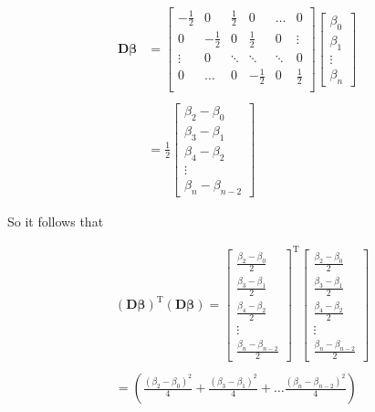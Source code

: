 \documentclass{article}
\newcommand{\B}{\boldsymbol\beta} %
\newcommand{\D}{\mathbf{D}}
\begin{document}
\begin{align*}
  \D\B &= \begin{bmatrix}
    -\frac{1}{2} & 0 & \frac{1}{2} & 0 & \dots & 0 \\
    0 & -\frac{1}{2} & 0 & \frac{1}{2} & 0 & \vdots \\
    \vdots & 0 & \ddots & \ddots & \ddots & 0 \\
    0 & \dots & 0 & -\frac{1}{2} & 0 & \frac{1}{2} \\ 
  \end{bmatrix} 
  \begin{bmatrix}
  \beta_0 \\
  \beta_1 \\
  \vdots \\
  \beta_n
  \end{bmatrix} \\\\
  &= \frac{1}{2}\begin{bmatrix}
  \beta_2 - \beta_0 \\ 
  \beta_3 - \beta_1 \\ 
  \beta_4 - \beta_2 \\
  \vdots \\
  \beta_n - \beta_{n-2}
  \end{bmatrix}
\end{align*}

So it follows that

\begin{align*}
  &(\D\B)^{\textrm{T}}(\D\B) = 
  \begin{bmatrix}
  \frac{\beta_2 - \beta_0}{2} \\ 
  \frac{\beta_3 - \beta_1}{2} \\ 
  \frac{\beta_4 - \beta_2}{2} \\
  \vdots \\
  \frac{\beta_n - \beta_{n-2}}{2}
  \end{bmatrix} ^ {\textrm{T}}
   \begin{bmatrix}
  \frac{\beta_2 - \beta_0}{2} \\ 
  \frac{\beta_3 - \beta_1}{2} \\ 
  \frac{\beta_4 - \beta_2}{2} \\
  \vdots \\
  \frac{\beta_n - \beta_{n-2}}{2}
  \end{bmatrix} \\\\
  &= \left( \frac{(\beta_2 - \beta_0)^2}{4} + \frac{(\beta_3 - \beta_1)^2}{4} + \dots \frac{(\beta_n - \beta_{n-2})^2}{4} \right)
\end{align*}
\end{document}
